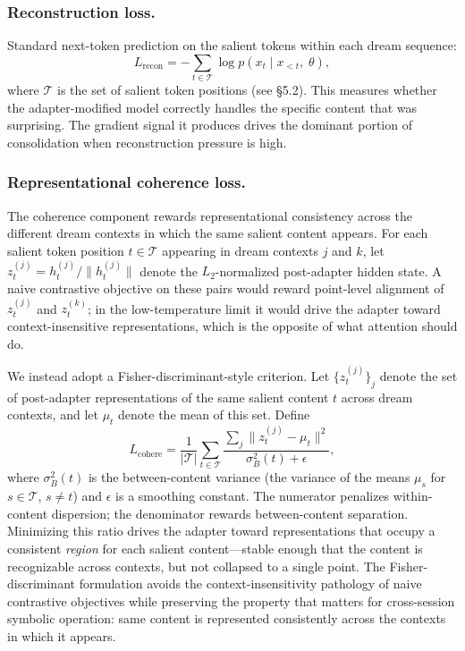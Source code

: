 \documentclass[11pt]{article}
\newcommand{\norm}[1]{\lVert #1 \rVert}
\begin{document}
\subsubsection*{Reconstruction loss.}

Standard next-token prediction on the salient tokens within each dream sequence:
\begin{equation}\label{eq:recon}
    L_\text{recon} = -\sum_{t \in \mathcal{T}} \log p(x_t \mid x_{<t},\; \theta),
\end{equation}
where $\mathcal{T}$ is the set of salient token positions (see \S 5.2). This measures whether the adapter-modified model correctly handles the specific content that was surprising. The gradient signal it produces drives the dominant portion of consolidation when reconstruction pressure is high.

\subsubsection*{Representational coherence loss.}

The coherence component rewards representational consistency across the different dream contexts in which the same salient content appears. For each salient token position $t \in \mathcal{T}$ appearing in dream contexts $j$ and $k$, let $z_t^{(j)} = h_t^{(j)} / \norm{h_t^{(j)}}$ denote the $L_2$-normalized post-adapter hidden state. A naive contrastive objective on these pairs would reward point-level alignment of $z_t^{(j)}$ and $z_t^{(k)}$; in the low-temperature limit it would drive the adapter toward context-insensitive representations, which is the opposite of what attention should do.

We instead adopt a Fisher-discriminant-style criterion. Let $\{z_t^{(j)}\}_j$ denote the set of post-adapter representations of the same salient content $t$ across dream contexts, and let $\mu_t$ denote the mean of this set. Define
\begin{equation}\label{eq:cohere}
    L_\text{cohere} = \frac{1}{|\mathcal{T}|} \sum_{t \in \mathcal{T}} \frac{\sum_j \norm{z_t^{(j)} - \mu_t}^2}{\sigma_B^2(t) + \epsilon},
\end{equation}
where $\sigma_B^2(t)$ is the between-content variance (the variance of the means $\mu_s$ for $s \in \mathcal{T}$, $s \neq t$) and $\epsilon$ is a smoothing constant. The numerator penalizes within-content dispersion; the denominator rewards between-content separation. Minimizing this ratio drives the adapter toward representations that occupy a consistent \emph{region} for each salient content---stable enough that the content is recognizable across contexts, but not collapsed to a single point. The Fisher-discriminant formulation avoids the context-insensitivity pathology of naive contrastive objectives while preserving the property that matters for cross-session symbolic operation: same content is represented consistently across the contexts in which it appears.
\end{document}
